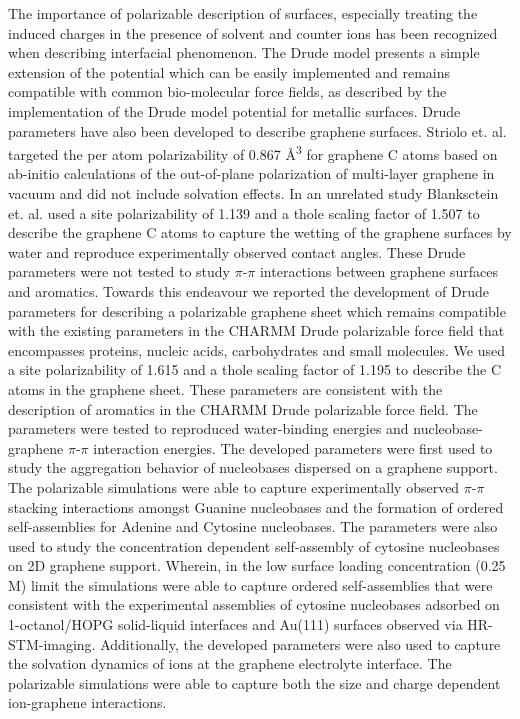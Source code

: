 The importance of polarizable description of surfaces, especially treating the induced charges in the presence of solvent and counter ions has been recognized when describing interfacial phenomenon\supercite{kondrat_theory_2023,siepmann_influence_1995}. The Drude model presents a simple extension of the potential which can be easily implemented and remains compatible with common bio-molecular force fields, as described by the implementation of the Drude model potential for metallic surfaces.\supercite{geada_insight_2018} Drude parameters have also been developed to describe graphene surfaces.\supercite{ho_polarizability_2013,misra_insights_2017} Striolo et. al. targeted the per atom polarizability of 0.867 Å\textsuperscript{3} for graphene C atoms based on ab-initio calculations of the out-of-plane polarization of multi-layer graphene in vacuum and did not include solvation effects.\supercite{ho_polarizability_2013} In an unrelated study Blanksctein et. al. used a site polarizability of 1.139 and a thole scaling factor of 1.507 to describe the graphene C atoms to capture the wetting of the graphene surfaces by water and reproduce experimentally observed contact angles.\supercite{misra_insights_2017} These Drude parameters were not tested to study $\pi$-$\pi$ interactions between graphene surfaces and aromatics. Towards this endeavour we reported the development of Drude parameters for describing a polarizable graphene sheet which remains compatible with the existing parameters in the CHARMM Drude polarizable force field that encompasses proteins, nucleic acids, carbohydrates and small molecules.\supercite{h_polarization_2021} We used a site polarizability of 1.615 and a thole scaling factor of 1.195 to describe the C atoms in the graphene sheet. These parameters are consistent with the description of aromatics in the CHARMM Drude polarizable force field.\supercite{lopes_polarizable_2007} The parameters were tested to reproduced water-binding energies and nucleobase-graphene $\pi$-$\pi$ interaction energies. The developed parameters were first used to study the aggregation behavior of nucleobases dispersed on a graphene support.\supercite{h_polarization_2021} The polarizable simulations were able to capture experimentally observed $\pi$-$\pi$ stacking interactions amongst Guanine nucleobases\supercite{varghese_binding_2009} and the formation of ordered self-assemblies for Adenine and Cytosine nucleobases.\supercite{otero_elementary_2008,wandlowski_structure_1996} The parameters were also used to study the concentration dependent self-assembly of cytosine nucleobases on 2D graphene support.\supercite{h_capturing_2022} Wherein, in the low surface loading concentration (0.25 M) limit the simulations were able to capture ordered self-assemblies that were consistent with the experimental assemblies of cytosine nucleobases adsorbed on 1-octanol/HOPG solid-liquid interfaces\supercite{xu_coadsorption_2006} and Au(111) surfaces\supercite{otero_elementary_2008,wandlowski_structure_1996} observed via HR-STM-imaging. Additionally, the developed parameters were also used to capture the solvation dynamics of ions at the graphene electrolyte interface.\supercite{h_capturing_2023} The polarizable simulations were able to capture both the size and charge dependent ion-graphene interactions. 
